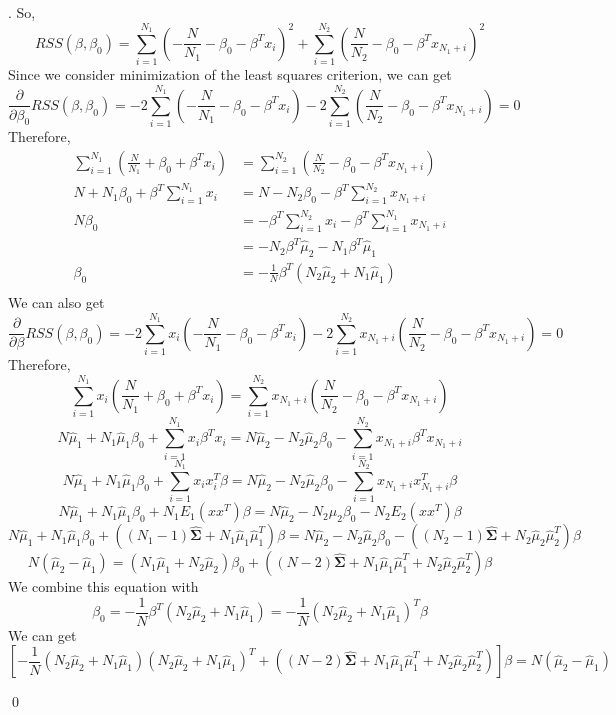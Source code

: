 \documentclass[12pt]{article}
\newenvironment{sol}
  {\par\vspace{3mm}\noindent{\it Solution}.}
  {\qed}
\begin{document}
\begin{sol}
So,
$$RSS(\beta,\beta_0) = \sum_{i=1}^{N_1}(-\frac{N}{N_1}-\beta_0-\beta^{T}x_i)^2+\sum_{i=1}^{N_2}(\frac{N}{N_2}-\beta_0-\beta^Tx_{N_1+i})^2$$
Since we consider minimization of the least squares criterion, we can get
$$\frac{\partial}{\partial\beta_0}RSS(\beta,\beta_0) = -2\sum_{i=1}^{N_1}(-\frac{N}{N_1}-\beta_0-\beta^{T}x_i)
-2\sum_{i=1}^{N_2}(\frac{N}{N_2}-\beta_0-\beta^Tx_{N_1+i})=0$$
Therefore,
\begin{equation*}
\begin{split}
\sum_{i=1}^{N_1}(\frac{N}{N_1}+\beta_0+\beta^{T}x_i) &= \sum_{i=1}^{N_2}(\frac{N}{N_2}-\beta_0-\beta^Tx_{N_1+i})\\
N+N_1\beta_0+\beta^T\sum_{i=1}^{N_1}x_i &= N-N_2\beta_0-\beta^T\sum_{i=1}^{N_2}x_{N_1+i}\\
N\beta_0 &= -\beta^T\sum_{i=1}^{N_2}x_i-\beta^T\sum_{i=1}^{N_1}x_{N_1+i}\\
&= -N_2\beta^T\hat{\mu}_2-N_1\beta^T\hat{\mu}_1\\
\beta_0 &= -\frac{1}{N}\beta^T(N_2\hat{\mu}_2+N_1\hat{\mu}_1)\\
\end{split}
\end{equation*}
We can also get
$$\frac{\partial}{\partial\beta}RSS(\beta,\beta_0) = -2\sum_{i=1}^{N_1}x_i(-\frac{N}{N_1}-\beta_0-\beta^{T}x_i)
-2\sum_{i=1}^{N_2}x_{N_1+i}(\frac{N}{N_2}-\beta_0-\beta^Tx_{N_1+i})=0$$
Therefore,
$$\sum_{i=1}^{N_1}x_i(\frac{N}{N_1}+\beta_0+\beta^{T}x_i) = \sum_{i=1}^{N_2}x_{N_1+i}(\frac{N}{N_2}-\beta_0-\beta^Tx_{N_1+i})$$
$$N\hat{\mu}_1+N_1\hat{\mu}_1\beta_0+\sum_{i=1}^{N_1}x_i\beta^{T}x_i = N\hat{\mu}_2-N_2\hat{\mu}_2\beta_0-\sum_{i=1}^{N_2}x_{N_1+i}\beta^{T}x_{N_1+i}$$
$$N\hat{\mu}_1+N_1\hat{\mu}_1\beta_0+\sum_{i=1}^{N_1}x_ix_i^T\beta = N\hat{\mu}_2-N_2\hat{\mu}_2\beta_0-\sum_{i=1}^{N_2}x_{N_1+i}x_{N_1+i}^T\beta$$
$$N\hat{\mu}_1+N_1\hat{\mu}_1\beta_0+N_1E_1(xx^T)\beta = N\hat{\mu}_2-N_2\hat{\mu}_2\beta_0-N_2E_2(xx^T)\beta$$
$$N\hat{\mu}_1+N_1\hat{\mu}_1\beta_0+((N_1-1)\hat{\mathbf{\Sigma}}+N_1\hat{\mu}_1\hat{\mu}_1^T)\beta = N\hat{\mu}_2-N_2\hat{\mu}_2\beta_0-((N_2-1)\hat{\mathbf{\Sigma}}+N_2\hat{\mu}_2\hat{\mu}_2^T)\beta$$
$$N(\hat{\mu}_2-\hat{\mu}_1)=(N_1\hat{\mu}_1+N_2\hat{\mu}_2)\beta_0+((N-2)\hat{\mathbf{\Sigma}}+N_1\hat{\mu}_1\hat{\mu}_1^T+N_2\hat{\mu}_2\hat{\mu}_2^T)\beta$$
We combine this equation with
$$\beta_0 = -\frac{1}{N}\beta^T(N_2\hat{\mu}_2+N_1\hat{\mu}_1)=-\frac{1}{N}(N_2\hat{\mu}_2+N_1\hat{\mu}_1)^T\beta$$
We can get
$$\left[-\frac{1}{N}(N_2\hat{\mu}_2+N_1\hat{\mu}_1)(N_2\hat{\mu}_2+N_1\hat{\mu}_1)^T+((N-2)\hat{\mathbf{\Sigma}}+N_1\hat{\mu}_1\hat{\mu}_1^T+N_2\hat{\mu}_2\hat{\mu}_2^T)\right]\beta=N(\hat{\mu}_2-\hat{\mu}_1)$$

\end{sol}
\end{document}
